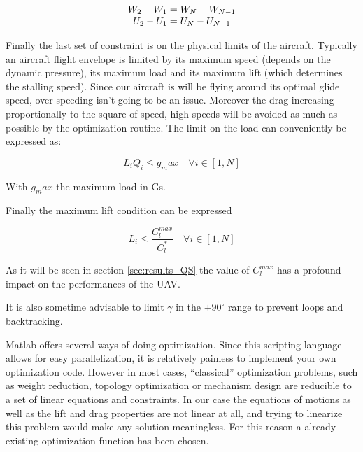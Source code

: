 \begin{equation}
  \begin{array}[c]{c}
    W_2 - W_1 = W_N - W_{N-1} \\
    U_2 - U_1 = U_N - U_{N-1} 
  \end{array}
  \label{eqn:derivative_constraint}
\end{equation}

\par Finally the last set of constraint is on the physical limits of the aircraft.
Typically an aircraft flight envelope is limited by its maximum speed (depends on the dynamic pressure), its maximum load and its maximum lift (which determines the stalling speed).
Since our aircraft is will be flying around its optimal glide speed, over speeding isn't going to be an issue.
Moreover the drag increasing proportionally to the square of speed, high speeds will be avoided as much as possible by the optimization routine.
The limit on the load can conveniently be expressed as:

\begin{equation}
  L_i Q_i \leq g_max \quad \forall i \in [1,N]
  \label{eqn:load_constraint}
\end{equation}

With $g_max$ the maximum load in Gs.


\par Finally the maximum lift condition can be expressed

\begin{equation}
  L_i \le \frac{C_l^{max}}{C_l^*} \quad \forall i \in [1,N]
  \label{eqn:lift_constraint}
\end{equation}

As it will be seen in section \ref{sec:results_QS} the value of $C_l^{max}$ has a profound impact on the performances of the UAV.

\par It is also sometime advisable to limit $\gamma$ in the $\pm 90^{\circ}$ range to prevent loops and backtracking.


Matlab offers several ways of doing optimization.
Since this scripting language allows for easy parallelization, it is relatively painless to implement your own optimization code.
However in most cases, ``classical'' optimization problems, such as weight reduction, topology optimization or mechanism design are reducible to a set of linear  equations and constraints.
In our case the equations of motions as well as the lift and drag properties are not linear at all, and trying to linearize this problem would make any solution meaningless.
For this reason a already existing optimization function has been chosen.

